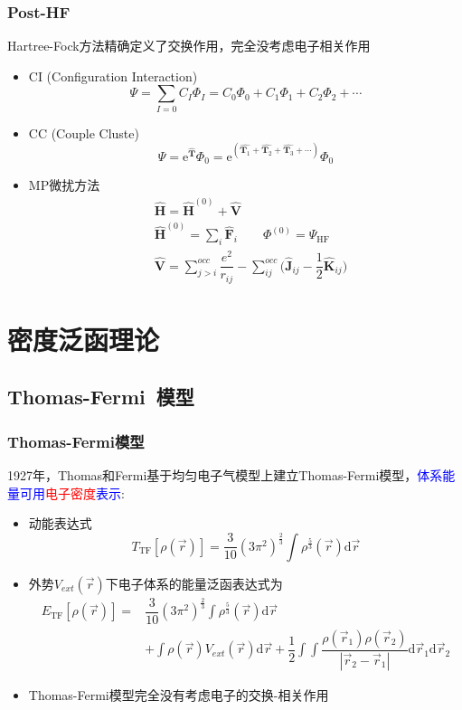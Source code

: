\documentclass[cjk,slidestop,compress,mathserif,blue]{beamer}
\begin{document}
\frame
{
	\frametitle{\textrm{Post-HF}}
	\textrm{Hartree-Fock}方法精确定义了交换作用，完全没考虑电子相关作用
	\begin{itemize}
		\item \textrm{CI (Configuration Interaction)}
	$$\Psi=\sum_{I=0}C_I\Phi_I=C_0\Phi_0+C_1\Phi_1+C_2\Phi_2+\cdots$$
		\item \textrm{CC (Couple Cluste)}\\
			\begin{displaymath}
				\Psi=\mathrm{e}^{\hat{\mathbf T}}\Phi_0=\mathrm{e}^{(\hat{\mathbf T_1}+\hat{\mathbf T_2}+\hat{\mathbf T_3}+\cdots)}\Phi_0
			\end{displaymath}
		\item \textrm{MP}微扰方法
			\begin{displaymath}
				\begin{aligned}
					&\hat{\mathbf H}=\hat{\mathbf H}^{(0)}+\hat{\mathbf V} \\
					&\hat{\mathbf H}^{(0)}=\sum_i\hat{\mathbf F}_i \qquad \Phi^{(0)}=\Psi_{\mathrm{HF}}\\ 
					&\hat{\mathbf V}=\sum_{j>i}^{occ}\dfrac{e^2}{r_{ij}}-\sum_{ij}^{occ}\big(\hat{\mathbf J}_{ij}-\dfrac12\hat{\mathbf K}_{ij}\big)
				\end{aligned}
			\end{displaymath}
	\end{itemize}
}

\section{密度泛函理论}       %
\subsection{\rm{Thomas-Fermi~}模型}       %
\frame
{
	\frametitle{\textrm{Thomas-Fermi}模型} 
	1927年，\textrm{Thomas}和\textrm{Fermi}基于均匀电子气模型上建立\textrm{Thomas-Fermi}模型，\textcolor{blue}{体系能量可用}\textcolor{red}{电子密度}\textcolor{blue}{表示}:
	\begin{itemize}
		\item 动能表达式
			$$T_{\mathrm{TF}}[\rho(\vec r)]=\dfrac3{10}(3\pi^2)^{\frac23}\int\rho^{\frac53}(\vec r)\mathrm{d}\vec r$$
		\item 外势$V_{ext}(\vec r)$下电子体系的能量泛函表达式为
			\begin{displaymath}
				\begin{aligned}
					E_{\mathrm{TF}}[\rho(\vec r)]=&\dfrac3{10}(3\pi^2)^{\frac23}\int\rho^{\frac53}(\vec r)\mathrm{d}\vec r\\
					&+\int\rho(\vec r)V_{ext}(\vec r)\mathrm{d}\vec r+\dfrac12\int\int\dfrac{\rho(\vec r_1)\rho(\vec r_2)}{|\vec r_2-\vec r_1|}\mathrm{d}\vec r_1\mathrm{d}\vec r_2
				\end{aligned}
			\end{displaymath}
		\item \textrm{Thomas-Fermi}模型完全没有考虑电子的交换-相关作用
	\end{itemize}
}
\end{document}
